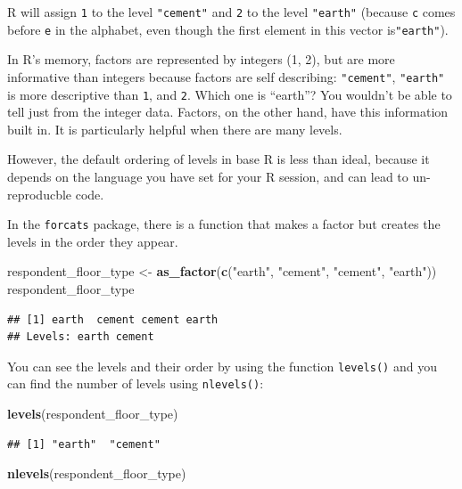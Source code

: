 \documentclass[]{book}
\newenvironment{Shaded}{\begin{snugshade}}{\end{snugshade}}
\newcommand{\KeywordTok}[1]{\textcolor[rgb]{0.13,0.29,0.53}{\textbf{#1}}}
\newcommand{\StringTok}[1]{\textcolor[rgb]{0.31,0.60,0.02}{#1}}
\newcommand{\NormalTok}[1]{#1}
\begin{document}
R will assign \texttt{1} to the level \texttt{"cement"} and \texttt{2}
to the level \texttt{"earth"} (because \texttt{c} comes before
\texttt{e} in the alphabet, even though the first element in this vector
is\texttt{"earth"}).

In R's memory, factors are represented by integers (1, 2), but are more
informative than integers because factors are self describing:
\texttt{"cement"}, \texttt{"earth"} is more descriptive than \texttt{1},
and \texttt{2}. Which one is ``earth''? You wouldn't be able to tell
just from the integer data. Factors, on the other hand, have this
information built in. It is particularly helpful when there are many
levels.

However, the default ordering of levels in base R is less than ideal,
because it depends on the language you have set for your R session, and
can lead to un-reproducble code.

In the \texttt{forcats} package, there is a function that makes a factor
but creates the levels in the order they appear.

\begin{Shaded}
\begin{Highlighting}[]
\NormalTok{respondent_floor_type <-}\StringTok{ }\KeywordTok{as_factor}\NormalTok{(}\KeywordTok{c}\NormalTok{(}\StringTok{"earth"}\NormalTok{, }\StringTok{"cement"}\NormalTok{, }\StringTok{"cement"}\NormalTok{, }\StringTok{"earth"}\NormalTok{))}
\NormalTok{respondent_floor_type}
\end{Highlighting}
\end{Shaded}

\begin{verbatim}
## [1] earth  cement cement earth 
## Levels: earth cement
\end{verbatim}

You can see the levels and their order by using the function
\texttt{levels()} and you can find the number of levels using
\texttt{nlevels()}:

\begin{Shaded}
\begin{Highlighting}[]
\KeywordTok{levels}\NormalTok{(respondent_floor_type)}
\end{Highlighting}
\end{Shaded}

\begin{verbatim}
## [1] "earth"  "cement"
\end{verbatim}

\begin{Shaded}
\begin{Highlighting}[]
\KeywordTok{nlevels}\NormalTok{(respondent_floor_type)}
\end{Highlighting}
\end{Shaded}
\end{document}
